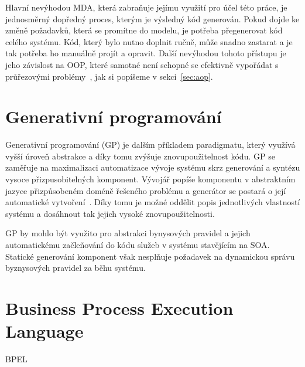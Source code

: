 Hlavní nevýhodou \gls{MDA}, která zabraňuje jejímu využití
pro účel této práce, je jednosměrný dopředný proces, kterým je výsledný kód generován.
Pokud dojde ke změně požadavků, která se promítne do modelu, je potřeba přegenerovat
kód celého systému. Kód, který bylo nutno doplnit ručně, může snadno zastarat a je tak
potřeba ho manuálně projít a opravit.
Další nevýhodou tohoto přístupu je jeho závislost na \gls{OOP},
které samotné není schopné se efektivně vypořádat s průřezovými
problémy~\cite{cemus2014aspect}, jak si popíšeme v sekci~\ref{sec:aop}.

\section{Generativní programování}

Generativní programování (\gls{GP}) je dalším příkladem paradigmatu, který
využívá vyšší úroveň abstrakce a díky tomu zvýšuje znovupoužitelnost
kódu. \gls{GP} se zaměřuje na maximalizaci automatizace vývoje systému
skrz generování a syntézu vysoce přizpusobitelných komponent. Vývojář
popíše komponentu v abstraktním jazyce přizpůsobeném doméně řešeného
problému a generátor se postará o její automatické vytvoření~\cite{czarnecki2000generative}.
Díky tomu je možné oddělit popis jednotlivých vlastností systému a dosáhnout tak
jejich vysoké znovupoužitelnosti.

\gls{GP} by mohlo být využito pro abstrakci bynysových pravidel a jejich automatickému
začleňování do kódu služeb v systému stavějícím na \gls{SOA}.
Statické generování komponent však nesplňuje požadavek na dynamickou správu
byznysových pravidel za běhu systému.

\section{Business Process Execution Language}

\gls{BPEL}


